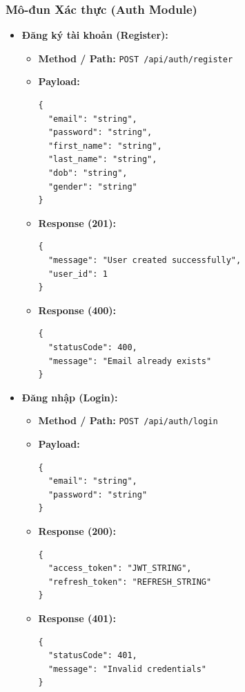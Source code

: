 \documentclass[../main.tex]{subfiles}
\begin{document}
\subsubsection{Mô-đun Xác thực (Auth Module)}
\begin{itemize}[leftmargin=*]
    \item \textbf{Đăng ký tài khoản (Register):}
    \begin{itemize}
        \item \textbf{Method / Path:} \texttt{POST /api/auth/register}
        \item \textbf{Payload:}
\begin{lstlisting}[style=jsonstyle]
{
  "email": "string",
  "password": "string",
  "first_name": "string",
  "last_name": "string",
  "dob": "string",
  "gender": "string"
}
\end{lstlisting}
        \item \textbf{Response (201):}
\begin{lstlisting}[style=jsonstyle]
{
  "message": "User created successfully",
  "user_id": 1
}
\end{lstlisting}
        \item \textbf{Response (400):}
\begin{lstlisting}[style=jsonstyle]
{
  "statusCode": 400,
  "message": "Email already exists"
}
\end{lstlisting}
    \end{itemize}
    \item \textbf{Đăng nhập (Login):}
    \begin{itemize}
        \item \textbf{Method / Path:} \texttt{POST /api/auth/login}
        \item \textbf{Payload:}
\begin{lstlisting}[style=jsonstyle]
{
  "email": "string",
  "password": "string"
}
\end{lstlisting}
        \item \textbf{Response (200):}
\begin{lstlisting}[style=jsonstyle]
{
  "access_token": "JWT_STRING",
  "refresh_token": "REFRESH_STRING"
}
\end{lstlisting}
        \item \textbf{Response (401):}
\begin{lstlisting}[style=jsonstyle]
{
  "statusCode": 401,
  "message": "Invalid credentials"
}
\end{lstlisting}
    \end{itemize}
\end{itemize}
\end{document}
